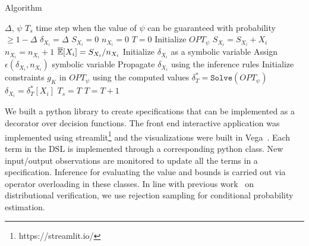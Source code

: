 \begin{algorithm}
    \caption{\AVOIRmethodname{} Algorithm}
    \label{alg:method}
    \begin{algorithmic}[1] %
        \Require $\Delta$, $\psi$  
        \Ensure $T_s$ time step when the value of $\psi$ can be guaranteed with probability $ \geq 1 - \Delta$
            \State $\delta_{X_i} = \Delta$ 
            \State $S_{X_i} = 0$ 
            \State $n_{X_i} = 0$ 
        \EndFor
        \State $T = 0$ 
        \State Initialize $OPT_\psi$ 
                \State $S_{X_i} = S_{X_i} + X_i$
                \State $n_{X_i} = n_{X_i} + 1$
                \State $\overline{\mathbb{E}}[X_i] = S_{X_i}/n_{X_i}$
                \State Initialize $\delta_{X_i}$ as a symbolic variable
                \State Assign $\epsilon(\delta_{X_i}, n_{X_i})$ symbolic variable
            \EndFor
            \State Propagate $\delta_{X_i}$ using the inference rules
            \State Initialize constraints $g_K$ in $OPT_\psi$ using the computed values
            \State $\delta^*_T = \texttt{Solve}(OPT_\psi)$
                \State $\delta_{X_i} = \delta^*_T[X_i]$ 
                \State \Return $T_s = T$
            \EndIf
            \State $T = T + 1$
        \EndProcedure
    \end{algorithmic}
    
\end{algorithm}

We built a python library to create specifications that can be implemented as a decorator over decision functions. 
The front end interactive application was implemented using streamlit\footnote{https://streamlit.io/} and the visualizations were built in Vega~\cite{satyanarayan2015reactive}.
Each term in the DSL is implemented through a corresponding python class.
New input/output observations are monitored to update all the terms in a specification.
Inference for evaluating the value and bounds is carried out via operator overloading in these classes. 
In line with previous work~\citep{albarghouthi2017fairsquare,bastani2019probabilistic,albarghouthi2019fairness} on distributional verification, we use rejection sampling for conditional probability estimation.



